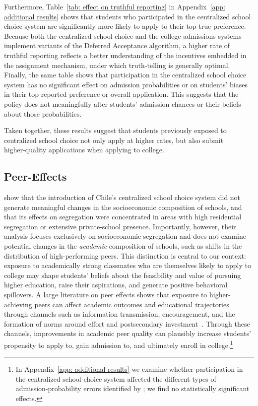 \documentclass[11pt]{article}
\begin{document}
Furthermore, Table~\ref{tab: effect on truthful reporting} in Appendix~\ref{app: additional results} shows that students who participated in the centralized school choice system are significantly more likely to apply to their top true preference. Because both the centralized school choice and the college admissions systems implement variants of the Deferred Acceptance algorithm, a higher rate of truthful reporting reflects a better understanding of the incentives embedded in the assignment mechanism, under which truth‑telling is generally optimal. Finally, the same table shows that participation in the centralized school choice system has no significant effect on admission probabilities or on students’ biases in their top reported preference or overall application. This suggests that the policy does not meaningfully alter students’ admission chances or their beliefs about those probabilities.

Taken together, these results suggest that students previously exposed to centralized school choice not only apply at higher rates, but also submit higher‑quality applications when applying to college.



\subsection{Peer-Effects}
\citet{urzua2023} show that the introduction of Chile's centralized school choice system did not generate meaningful changes in the socioeconomic composition of schools, and that its effects on segregation were concentrated in areas with high residential segregation or extensive private-school presence. Importantly, however, their analysis focuses exclusively on socioeconomic segregation and does not examine potential changes in the \emph{academic} composition of schools, such as shifts in the distribution of high-performing peers. This distinction is central to our context: exposure to academically strong classmates who are themselves likely to apply to college may shape students' beliefs about the feasibility and value of pursuing higher education, raise their aspirations, and generate positive behavioral spillovers. A large literature on peer effects shows that exposure to higher-achieving peers can affect academic outcomes and educational trajectories through channels such as information transmission, encouragement, and the formation of norms around effort and postsecondary investment~\citep{hoxby2000b, Sacerdote2001, CarrellSacerdoteWest2013}. Through these channels, improvements in academic peer quality can plausibly increase students' propensity to apply to, gain admission to, and ultimately enroll in college.\footnote{In Appendix~\ref{app: additional results} we examine whether participation in the centralized school‑choice system affected the different types of admission‑probability errors identified by \cite{larroucau2024}; we find no statistically significant effects. }
\end{document}
